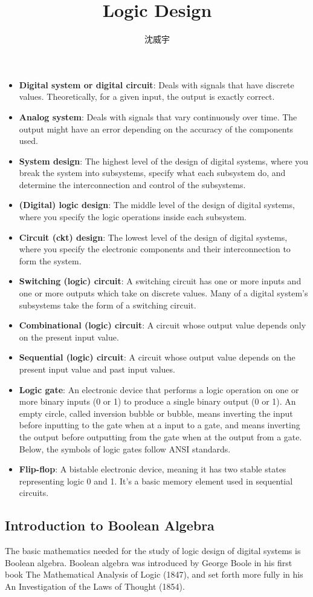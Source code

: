 \documentclass[a4paper,12pt]{article}
\begin{document}
\title{Logic Design}
\author{沈威宇}
\date{\temtoday}
\titletocdoc
{}
\begin{itemize}
\item\textbf{Digital system or digital circuit}: Deals with signals that have discrete values. Theoretically, for a given input, the output is exactly correct.
\item\textbf{Analog system}: Deals with signals that vary continuously over time. The output might have an error depending on the accuracy of the components used.
\item\textbf{System design}: The highest level of the design of digital systems, where you break the system into subsystems, specify what each subsystem do, and determine the interconnection and control of the subsystems.
\item\textbf{(Digital) logic design}: The middle level of the design of digital systems, where you specify the logic operations inside each subsystem.
\item\textbf{Circuit (ckt) design}: The lowest level of the design of digital systems, where you specify the electronic components and their interconnection to form the system.
\item\textbf{Switching (logic) circuit}: A switching circuit has one or more inputs and one or more outputs which take on discrete values. Many of a digital system's subsystems take the form of a switching circuit.
\item\textbf{Combinational (logic) circuit}: A circuit whose output value depends only on the present input value.
\item\textbf{Sequential (logic) circuit}: A circuit whose output value depends on the present input value and past input values.
\item\textbf{Logic gate}: An electronic device that performs a logic operation on one or more binary inputs (0 or 1) to produce a single binary output (0 or 1). An empty circle, called inversion bubble or bubble, means inverting the input before inputting to the gate when at a input to a gate, and means inverting the output before outputting from the gate when at the output from a gate. Below, the symbols of logic gates follow ANSI standards.
\item\textbf{Flip-flop}: A bistable electronic device, meaning it has two stable states representing logic 0 and 1. It's a basic memory element used in sequential circuits.
\end{itemize}
\subsection{Introduction to Boolean Algebra}
The basic mathematics needed for the study of logic design of digital systems is Boolean algebra. Boolean algebra was introduced by George Boole in his first book The Mathematical Analysis of Logic (1847), and set forth more fully in his An Investigation of the Laws of Thought (1854).
\end{document}
